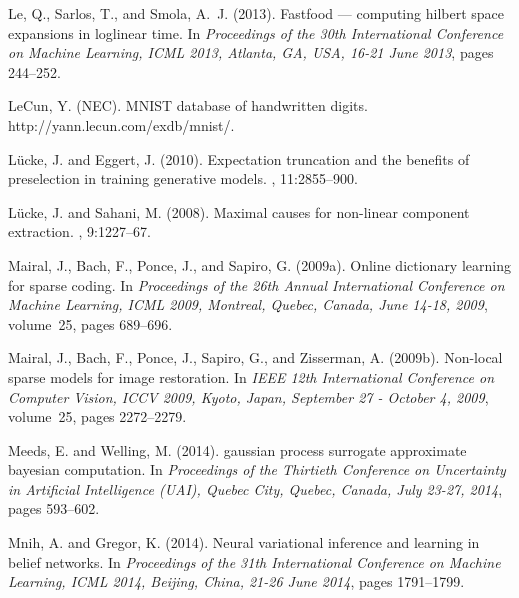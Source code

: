 \documentclass[12pt]{article}
\begin{document}
\begin{thebibliography}{}
Le, Q., Sarlos, T., and Smola, A.~J. (2013).
\newblock Fastfood --- computing hilbert space expansions in loglinear time.
\newblock In {\em Proceedings of the 30th International Conference on Machine
  Learning, {ICML} 2013, Atlanta, GA, USA, 16-21 June 2013}, pages 244--252.

LeCun, Y. (NEC).
\newblock \mbox{MNIST} database of handwritten digits.
\newblock http://yann.lecun.com/exdb/mnist/.

L\"ucke, J. and Eggert, J. (2010).
\newblock Expectation truncation and the benefits of preselection in training
  generative models.
, 11:2855--900.

L\"ucke, J. and Sahani, M. (2008).
\newblock Maximal causes for non-linear component extraction.
, 9:1227--67.

Mairal, J., Bach, F., Ponce, J., and Sapiro, G. (2009a).
\newblock Online dictionary learning for sparse coding.
\newblock In {\em Proceedings of the 26th Annual International Conference on
  Machine Learning, {ICML} 2009, Montreal, Quebec, Canada, June 14-18, 2009},
  volume~25, pages 689--696.

Mairal, J., Bach, F., Ponce, J., Sapiro, G., and Zisserman, A. (2009b).
\newblock Non-local sparse models for image restoration.
\newblock In {\em {IEEE} 12th International Conference on Computer Vision,
  {ICCV} 2009, Kyoto, Japan, September 27 - October 4, 2009}, volume~25, pages
  2272--2279.

Meeds, E. and Welling, M. (2014).
 gaussian process surrogate approximate bayesian
  computation.
\newblock In {\em Proceedings of the Thirtieth Conference on Uncertainty in
  Artificial Intelligence ({UAI}), Quebec City, Quebec, Canada, July 23-27,
  2014}, pages 593--602.

Mnih, A. and Gregor, K. (2014).
\newblock Neural variational inference and learning in belief networks.
\newblock In {\em Proceedings of the 31th International Conference on Machine
  Learning, {ICML} 2014, Beijing, China, 21-26 June 2014}, pages 1791--1799.


\end{thebibliography}
\end{document}
